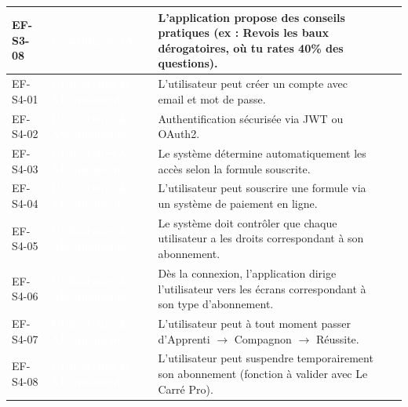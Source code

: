 \begin{longtable}{|P{1.75cm}|P{2.65cm}|P{7.45cm}|P{1.80cm}|P{1.55cm}|}
EF-S3-08 & \textcolor{white}{\textbf{Coaching \& IA}} & L’application propose des conseils pratiques (ex : \og{}Revois les baux dérogatoires, où tu rates 40\% des questions\fg{}). &  &  \\ \hline
EF-S4-01 & \textcolor{white}{\textbf{Utilisateurs \& Abonnements}} & L’utilisateur peut créer un compte avec email et mot de passe. &  &  \\ \hline
EF-S4-02 & \textcolor{white}{\textbf{Utilisateurs \& Abonnements}} & Authentification sécurisée via JWT ou OAuth2. &  &  \\ \hline
EF-S4-03 & \textcolor{white}{\textbf{Utilisateurs \& Abonnements}} & Le système détermine automatiquement les accès selon la formule souscrite. &  &  \\ \hline
EF-S4-04 & \textcolor{white}{\textbf{Utilisateurs \& Abonnements}} & L’utilisateur peut souscrire une formule via un système de paiement en ligne. &  &  \\ \hline
EF-S4-05 & \textcolor{white}{\textbf{Utilisateurs \& Abonnements}} & Le système doit contrôler que chaque utilisateur a les droits correspondant à son abonnement. &  &  \\ \hline
EF-S4-06 & \textcolor{white}{\textbf{Utilisateurs \& Abonnements}} & Dès la connexion, l’application dirige l’utilisateur vers les écrans correspondant à son type d’abonnement. &  &  \\ \hline
EF-S4-07 & \textcolor{white}{\textbf{Utilisateurs \& Abonnements}} & L’utilisateur peut à tout moment passer d’Apprenti \ensuremath{\rightarrow} Compagnon \ensuremath{\rightarrow} Réussite. &  &  \\ \hline
EF-S4-08 & \textcolor{white}{\textbf{Utilisateurs \& Abonnements}} & L’utilisateur peut suspendre temporairement son abonnement (fonction à valider avec Le Carré Pro). &  &  \\ \hline

\end{longtable}
